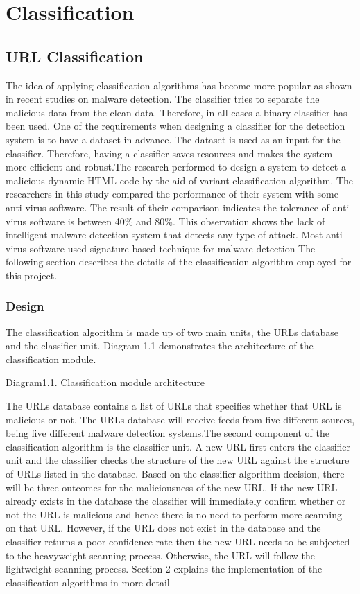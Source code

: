 \section{Classification}

\subsection{URL Classification}

The idea of applying classification algorithms has become more popular as shown in recent studies on malware detection. The classifier tries to separate the malicious data from the clean data. Therefore, in all cases a binary classifier has been used. One of the requirements when designing a classifier for the detection system is to have a dataset in advance. The dataset is used as an input for the classifier. Therefore, having a classifier saves resources and makes the system more efficient and robust.The research performed to design a system to detect a malicious dynamic HTML code by the aid of variant classification algorithm. The researchers in this study compared the performance of their system with some anti virus software. The result of their comparison indicates the tolerance of anti virus software is between 40\% and 80\%. This observation shows the lack of intelligent malware detection system that detects any type of attack. Most anti virus software used signature-based technique for malware detection\cite{Macilious-weblearning}  
 The following section describes the details of the classification algorithm employed for this project. 
\subsubsection{Design}
The classification algorithm is made up of two main units, the URLs database and the classifier unit. Diagram 1.1 demonstrates the architecture of the classification module.



Diagram1.1. Classification module architecture

The URLs database contains a list of URLs that specifies whether that URL is malicious or not. The URLs database will receive feeds from five different sources, being five different malware detection systems.The second component of the classification algorithm is the classifier unit. A new URL first enters the classifier unit and the classifier checks the structure of the new URL against the structure of URLs listed in the database. Based on the classifier algorithm decision, there will be three outcomes for the maliciousness of the new URL. If the new URL already exists in the database the classifier will immediately confirm whether or not the URL is malicious and hence there is no need to perform more scanning on that URL. However, if the URL does not exist in the database and the classifier returns a poor confidence rate then the new URL needs to be subjected to the heavyweight scanning process. Otherwise, the URL will follow the lightweight scanning process. Section 2 explains the implementation of the classification algorithms in more detail

